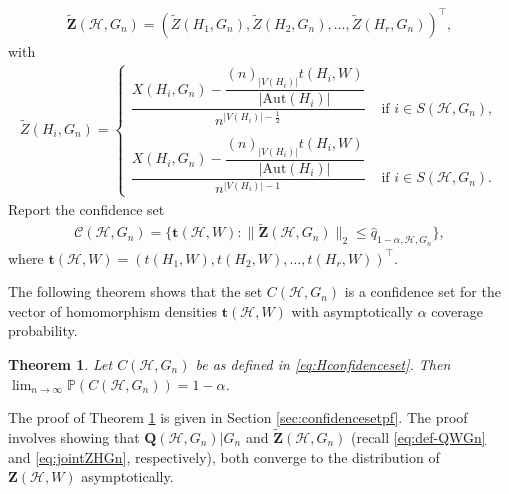 \documentclass[11pt,reqno]{amsart}
\numberwithin{equation}{section}
\newcommand{\cH}{{\mathcal H}}
\newtheorem{theorem}{Theorem}[section]
\theoremstyle{definition}
\begin{document}
\begin{itemize}
\begin{align}
\tilde{\bm Z}(\mathcal H, G_n) = ( \tilde{Z}(H_1, G_n), \tilde{Z}(H_2, G_n), \ldots, \tilde{Z}(H_r, G_n))^\top , 
\end{align}
with 
\begin{align}\label{eq:ZHconfidenceset}
\tilde Z(H_i, G_n) = 
\left\{
\begin{array}{cc}
  \dfrac{X(H_i, G_n) - \dfrac{(n)_{|V(H_i)|}t(H_i,W)}{|\mathrm{Aut}(H_i)|}}{n^{|V(H_i)|-\frac{1}{2}}} & \text{ if } i \in  S(\cH, G_n), \\ \\ 
 \dfrac{X(H_i, G_n) - \dfrac{(n)_{|V(H_i)|}t(H_i,W)}{|\mathrm{Aut}(H_i)|}}{n^{|V(H_i)|-1}} & \text{ if } i \in S(\cH, G_n).
\end{array}
\right. 
\end{align}
Report the confidence set 
\begin{align}\label{eq:Hconfidenceset}
\mathcal C(\cH, G_n) = \{ \bm t(\cH, W)  : \| \tilde{\bm Z}(\mathcal H, G_n) \|_2 \leq \hat{q}_{1-\alpha, \mathcal H, G_n} \} , 
\end{align}
where $\bm t(\cH, W) = (t(H_1, W), t(H_2, W), \ldots, t(H_r, W))^\top$. 
\end{itemize} 


The following theorem shows that the set $C(\cH, G_n)$ is a confidence set for the vector of homomorphism densities $\bm t(\cH, W)$ with asymptotically $\alpha$ coverage probability. 




\begin{theorem}\label{thm:LHW} Let $C(\cH, G_n)$ be as defined in \eqref{eq:Hconfidenceset}. Then $\lim_{n \rightarrow \infty} \mathbb P( C(\cH, G_n) ) = 1-\alpha$.
\end{theorem} 



The proof of Theorem \ref{thm:LHW} is given in Section \ref{sec:confidencesetpf}. The proof involves showing that $\bm{Q}(\mathcal{H}, G_{n})|G_n$ and $\tilde{\bm Z}(\mathcal H, G_n)$ (recall \eqref{eq:def-QWGn} and \eqref{eq:jointZHGn}, respectively), both converge to the distribution of $\bm Z(\cH, W)$ asymptotically. 
\end{document}
